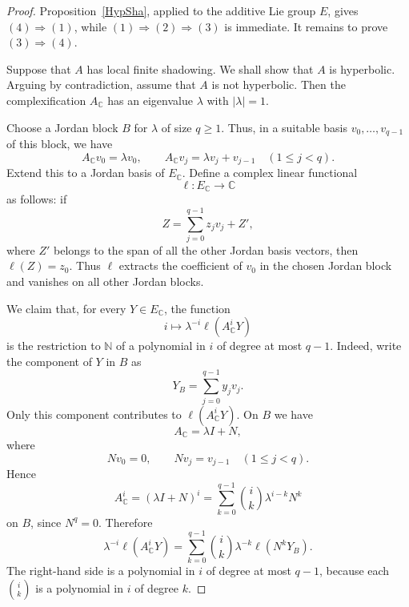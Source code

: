\documentclass[12pt]{amsart}
\theoremstyle{definition}
\numberwithin{equation}{section}
\theoremstyle{remark}
\begin{document}
\begin{proof}
Proposition~\ref{HypSha}, applied to the additive Lie group $E$, gives
$(4)\Rightarrow(1)$, while $(1)\Rightarrow(2)\Rightarrow(3)$ is immediate.
It remains to prove $(3)\Rightarrow(4)$.

Suppose that $A$ has local finite shadowing.
We shall show that $A$ is hyperbolic. Arguing by contradiction, assume that
$A$ is not hyperbolic. Then the complexification $A_{\mathbb C}$ has an
eigenvalue $\lambda$ with $|\lambda|=1$.

Choose a Jordan block $B$ for $\lambda$ of size $q\geq 1$. Thus, in a suitable
basis $v_0,\ldots,v_{q-1}$ of this block, we have
\[
A_{\mathbb C}v_0=\lambda v_0,\qquad
A_{\mathbb C}v_j=\lambda v_j+v_{j-1}\quad (1\leq j<q).
\]
Extend this to a Jordan basis of $E_{\mathbb C}$. Define a complex linear
functional
\[
\ell:E_{\mathbb C}\to\mathbb C
\]
as follows: if
\[
Z=\sum_{j=0}^{q-1} z_jv_j+Z',
\]
where $Z'$ belongs to the span of all the other Jordan basis vectors, then
$
\ell(Z)=z_0.
$
Thus $\ell$ extracts the coefficient of $v_0$ in the chosen Jordan block
and vanishes on all other Jordan blocks.

We claim that, for every $Y\in E_{\mathbb C}$, the function
\[
i\mapsto \lambda^{-i}\ell(A_{\mathbb C}^iY)
\]
is the restriction to $\mathbb N$ of a polynomial in $i$ of degree at most
$q-1$. Indeed, write the component of $Y$ in $B$ as
\[
Y_B=\sum_{j=0}^{q-1} y_jv_j.
\]
Only this component contributes to $\ell(A_{\mathbb C}^iY)$. On $B$ we have
\[
A_{\mathbb C}=\lambda I+N,
\]
where
\[
Nv_0=0,\qquad Nv_j=v_{j-1}\quad (1\leq j<q).
\]
Hence
\[
A_{\mathbb C}^i
=
(\lambda I+N)^i
=
\sum_{k=0}^{q-1}\binom{i}{k}\lambda^{i-k}N^k
\]
on $B$, since $N^q=0$. Therefore
\[
\lambda^{-i}\ell(A_{\mathbb C}^iY)
=
\sum_{k=0}^{q-1}\binom{i}{k}\lambda^{-k}\ell(N^kY_B).
\]
The right-hand side is a polynomial in $i$ of degree at most $q-1$, because
each $\binom{i}{k}$ is a polynomial in $i$ of degree $k$.


\end{proof}
\end{document}
